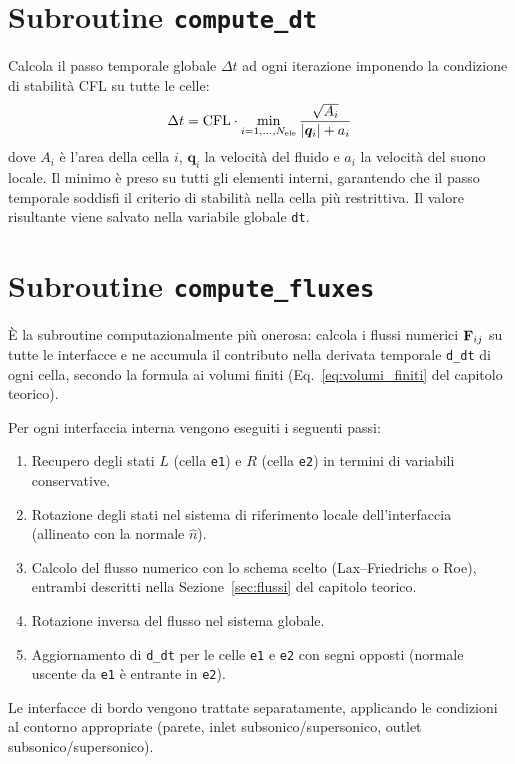 \section{Subroutine \texttt{compute\_dt}}

Calcola il passo temporale globale $\Delta t$ ad ogni iterazione
imponendo la condizione di stabilità CFL su tutte le celle:
\[
  \Delta t = \text{CFL} \cdot \min_{i=1,\ldots,N_{\rm ele}}
  \frac{\sqrt{A_i}}{|\bm{q}_i| + a_i}
\]
dove $A_i$ è l'area della cella $i$, $\bm{q}_i$ la velocità del fluido e
$a_i$ la velocità del suono locale.
Il minimo è preso su tutti gli elementi interni, garantendo che il passo
temporale soddisfi il criterio di stabilità nella cella più restrittiva.
Il valore risultante viene salvato nella variabile globale \texttt{dt}.

\section{Subroutine \texttt{compute\_fluxes}}

È la subroutine computazionalmente più onerosa: calcola i flussi numerici
$\mathbf{F}_{ij}$ su tutte le interfacce e ne accumula il contributo nella
derivata temporale \texttt{d\_dt} di ogni cella, secondo la formula
ai volumi finiti (Eq.~\ref{eq:volumi_finiti} del capitolo teorico).

Per ogni interfaccia interna vengono eseguiti i seguenti passi:
\begin{enumerate}
    \item Recupero degli stati $L$ (cella \texttt{e1}) e $R$ (cella
          \texttt{e2}) in termini di variabili conservative.
    \item Rotazione degli stati nel sistema di riferimento locale
          dell'interfaccia (allineato con la normale $\hat{n}$).
    \item Calcolo del flusso numerico con lo schema scelto
          (Lax--Friedrichs o Roe), entrambi descritti nella
          Sezione~\ref{sec:flussi} del capitolo teorico.
    \item Rotazione inversa del flusso nel sistema globale.
    \item Aggiornamento di \texttt{d\_dt} per le celle \texttt{e1} e
          \texttt{e2} con segni opposti (normale uscente da \texttt{e1}
          è entrante in \texttt{e2}).
\end{enumerate}
Le interfacce di bordo vengono trattate separatamente, applicando le
condizioni al contorno appropriate (parete, inlet subsonico/supersonico,
outlet subsonico/supersonico).

